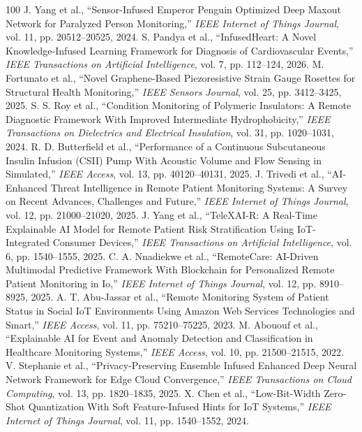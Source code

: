 \documentclass[journal]{IEEEtran}
\begin{document}
\begin{thebibliography}{100}
 J. Yang et al., ``Sensor-Infused Emperor Penguin Optimized Deep Maxout Network for Paralyzed Person Monitoring,'' \emph{IEEE Internet of Things Journal}, vol. 11, pp. 20512--20525, 2024.
 S. Pandya et al., ``InfusedHeart: A Novel Knowledge-Infused Learning Framework for Diagnosis of Cardiovascular Events,'' \emph{IEEE Transactions on Artificial Intelligence}, vol. 7, pp. 112--124, 2026.
 M. Fortunato et al., ``Novel Graphene-Based Piezoresistive Strain Gauge Rosettes for Structural Health Monitoring,'' \emph{IEEE Sensors Journal}, vol. 25, pp. 3412--3425, 2025.
 S. S. Roy et al., ``Condition Monitoring of Polymeric Insulators: A Remote Diagnostic Framework With Improved Intermediate Hydrophobicity,'' \emph{IEEE Transactions on Dielectrics and Electrical Insulation}, vol. 31, pp. 1020--1031, 2024.
 R. D. Butterfield et al., ``Performance of a Continuous Subcutaneous Insulin Infusion (CSII) Pump With Acoustic Volume and Flow Sensing in Simulated,'' \emph{IEEE Access}, vol. 13, pp. 40120--40131, 2025.
 J. Trivedi et al., ``AI-Enhanced Threat Intelligence in Remote Patient Monitoring Systems: A Survey on Recent Advances, Challenges and Future,'' \emph{IEEE Internet of Things Journal}, vol. 12, pp. 21000--21020, 2025.
 J. Yang et al., ``TeleXAI-R: A Real-Time Explainable AI Model for Remote Patient Risk Stratification Using IoT-Integrated Consumer Devices,'' \emph{IEEE Transactions on Artificial Intelligence}, vol. 6, pp. 1540--1555, 2025.
 C. A. Nnadiekwe et al., ``RemoteCare: AI-Driven Multimodal Predictive Framework With Blockchain for Personalized Remote Patient Monitoring in Io,'' \emph{IEEE Internet of Things Journal}, vol. 12, pp. 8910--8925, 2025.
 A. T. Abu-Jassar et al., ``Remote Monitoring System of Patient Status in Social IoT Environments Using Amazon Web Services Technologies and Smart,'' \emph{IEEE Access}, vol. 11, pp. 75210--75225, 2023.
 M. Abououf et al., ``Explainable AI for Event and Anomaly Detection and Classification in Healthcare Monitoring Systems,'' \emph{IEEE Access}, vol. 10, pp. 21500--21515, 2022.
 V. Stephanie et al., ``Privacy-Preserving Ensemble Infused Enhanced Deep Neural Network Framework for Edge Cloud Convergence,'' \emph{IEEE Transactions on Cloud Computing}, vol. 13, pp. 1820--1835, 2025.
 X. Chen et al., ``Low-Bit-Width Zero-Shot Quantization With Soft Feature-Infused Hints for IoT Systems,'' \emph{IEEE Internet of Things Journal}, vol. 11, pp. 1540--1552, 2024.

\end{thebibliography}
\end{document}
